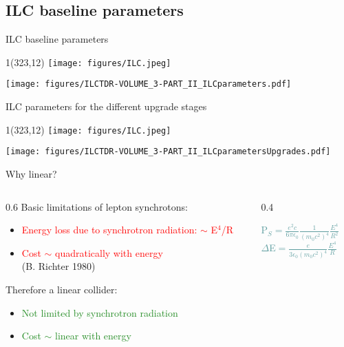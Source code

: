 \documentclass[xcolor={dvipsnames}]{beamer}
\newcommand{\ilclogo}{
  \setlength{\TPHorizModule}{1pt}
  \setlength{\TPVertModule}{1pt}
  \begin{textblock}{1}(323,12)
   \texttt{[image: figures/ILC.jpeg]}
  \end{textblock}
}
\begin{document}
\subsection{ILC baseline parameters}
\begin{frame}{ILC baseline parameters}
\ilclogo
\centering
	\texttt{[image: figures/ILCTDR-VOLUME\_3-PART\_II\_ILCparameters.pdf]}
\end{frame}
\begin{frame}{ILC parameters for the different upgrade stages}
\ilclogo
\centering
	\texttt{[image: figures/ILCTDR-VOLUME\_3-PART\_II\_ILCparametersUpgrades.pdf]}
\end{frame}

\begin{frame}{Why linear?}
\begin{columns}
 \begin{column}{0.6\textwidth}
  Basic limitations of lepton synchrotons:
\begin{itemize}
 \item \textcolor{Red}{Energy loss due to synchrotron radiation: $\sim$ E$^4$/R}
 \item \textcolor{Red}{Cost $\sim$ quadratically with energy}\\ \tiny{(B. Richter 
1980)}
\end{itemize}
\vspace*{1cm}
Therefore a linear collider:
\begin{itemize}
 \item \textcolor{ForestGreen}{Not limited by synchrotron radiation}
 \item \textcolor{ForestGreen}{Cost $\sim$ linear with energy}
\end{itemize}
 \end{column}
 \begin{column}{0.4\textwidth}
 \begin{block}{}
  \begin{center}
      \textcolor{CadetBlue}{P$_S=\frac{e^2c}{6\pi\epsilon_0}\frac{1}{(m_0c^2)^4}\frac{E^4}{R^2}$\\
  $\Delta$E$=\frac{e}{3\epsilon_0(m_0c^2)^4}\frac{E^4}{R}$}
   \end{center}
 \end{block}
 \end{column}
\end{columns}

\end{frame}
\end{document}
